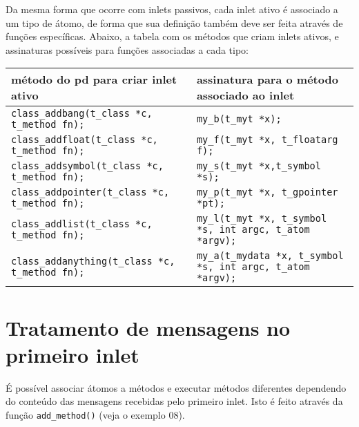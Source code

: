 Da mesma forma que ocorre com inlets passivos, cada inlet ativo é associado a
um tipo de átomo, de forma que sua definição também deve ser feita através de
funções específicas.  Abaixo, a tabela com os métodos que criam inlets ativos,
e assinaturas possíveis para funções associadas a cada tipo:

\begin{center}
\begin{tabular}{|l|l|}
\hline
método do pd para criar inlet ativo & assinatura para o método associado ao
inlet \\
\hline
\texttt{class\_addbang(t\_class *c, t\_method fn);} 	& \texttt{my\_b(t\_myt *x);} \\
\texttt{class\_addfloat(t\_class *c, t\_method fn);}	& \texttt{my\_f(t\_myt *x, t\_floatarg f);} \\
\texttt{class\_addsymbol(t\_class *c, t\_method fn);}	& \texttt{my\_s(t\_myt *x,t\_symbol *s);} \\
\texttt{class\_addpointer(t\_class *c, t\_method fn);}	& \texttt{my\_p(t\_myt *x, t\_gpointer *pt);} \\
\texttt{class\_addlist(t\_class *c, t\_method fn);}	& \texttt{my\_l(t\_myt *x, t\_symbol *s, int argc, t\_atom *argv);} \\
\texttt{class\_addanything(t\_class *c, t\_method fn);}	& \texttt{my\_a(t\_mydata *x, t\_symbol *s, int argc, t\_atom *argv);} \\
\hline
\end{tabular}
\end{center}

\section{Tratamento de mensagens no primeiro inlet}

É possível associar átomos a métodos e executar métodos diferentes dependendo
do conteúdo das mensagens recebidas pelo primeiro inlet. Isto é feito através da
função \texttt{add\_method()} (veja o exemplo 08).

